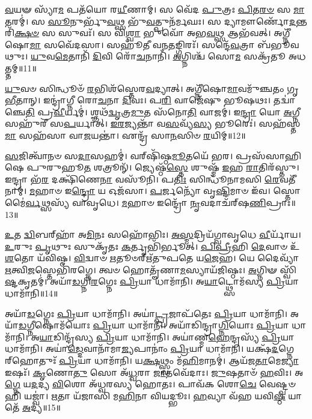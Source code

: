 \-\ul{𑌵}\-𑌯𑍟 𑌸𑍍𑌯𑌾᳴\-\ul{𑌮} 𑌪𑌤᳴𑌯𑍋 𑌰\-\ul{𑌯𑍀}\-𑌣𑌾𑌮𑍍।
𑌸 𑌵𑍇᳴𑌦 \ul{𑌪𑍁}\-𑌤𑍍𑌰𑌃 \ul{𑌪𑌿}\-𑌤\-\ul{𑌰}\-\-\ul{𑍞} 𑌸 \ul{𑌮𑌾}\-𑌤𑌰𑌮𑍍॑।
𑌸 \ul{𑌸𑍂}\-𑌨𑍁𑌰𑍍𑌭𑍁᳴\-\ul{𑌵}\-𑌥𑍍𑌸 𑌭𑍁᳴\-\ul{𑌵}\-𑌤𑍍𑌪𑍁𑌨᳴𑌰𑍍𑌮𑌘𑌃।
𑌸 𑌦𑍍𑌯𑌾𑌮𑍗𑌰𑍍𑌣𑍋᳴\-\ul{𑌦}\-𑌨𑍍𑌤𑌰𑌿᳴\-\ul{𑌕𑍍𑌷}\-\-\ul{𑍞} 𑌸 𑌸𑍁𑌵𑌃᳴।
𑌸 𑌵𑌿\-\ul{𑌶𑍍𑌵𑌾} 𑌭𑍁𑌵𑍋᳴ 𑌅𑌭\-\ul{𑌵}\-𑌥𑍍𑌸 𑌆𑌭᳴𑌵𑌤𑍍।
𑌅𑌗𑍍𑌨𑍀᳴𑌷𑍋\-\ul{𑌮𑌾} 𑌸𑌵𑍇᳴𑌦𑌸𑌾।
𑌸𑌹𑍂᳴𑌤𑍀 𑌵𑌨\-\ul{𑌤}\-𑌙𑍍𑌗𑌿𑌰𑌃᳴।
𑌸𑌨𑍍𑌦𑍇᳴\-\ul{𑌵}\-𑌤𑍍𑌰𑌾 𑌬᳴𑌭𑍂𑌵𑌥𑍁𑌃।
\-\ul{𑌯𑍁}\-𑌵\-\ul{𑌮𑍇}\-𑌤𑌾𑌨𑌿᳴ \ul{𑌦𑌿}\-𑌵𑌿 𑌰𑍋᳴\-\ul{𑌚}\-𑌨𑌾𑌨𑌿᳴।
\-\ul{𑌅}\-𑌗𑍍𑌨𑌿𑌶𑍍𑌚᳴ 𑌸𑍋\-\ul{𑌮} 𑌸𑌕𑍍𑌰᳴𑌤𑍂 𑌅𑌧𑌤𑍍𑌤𑌮𑍍॥11॥

\-\ul{𑌯𑍁}\-𑌵𑍞 𑌸𑌿𑌨𑍍𑌧𑍂𑍞᳴ \ul{𑌰}\-𑌭𑌿𑌶᳴𑌸𑍍𑌤𑍇𑌰\-\ul{𑌵}\-𑌦𑍍𑌯𑌾𑌤𑍍।
𑌅𑌗𑍍𑌨𑍀᳴𑌷𑍋\-\ul{𑌮𑌾}\-𑌵𑌮𑍁᳴𑌞𑍍𑌚𑌤𑌂 𑌗𑍃\-\ul{𑌭𑍀}\-𑌤𑌾𑌨𑍍।
𑌇𑌨𑍍𑌦𑍍𑌰𑌾॑𑌗𑍍𑌨𑍀 𑌰𑍋\-\ul{𑌚}\-𑌨𑌾 \ul{𑌦𑌿}\-𑌵𑌃।
𑌪\-\ul{𑌰𑌿} 𑌵𑌾𑌜𑍇᳴𑌷𑍁 𑌭𑍂𑌷𑌥𑌃।
𑌤𑌦𑍍𑌵𑌾॑𑌞𑍍𑌚𑍇\-\ul{𑌤𑌿} 𑌪𑍍𑌰\-\ul{𑌵𑍀}\-𑌰𑍍𑌯𑌮𑍍॑।
𑌶𑍍𑌞𑌥᳴\-\ul{𑌦𑍍𑌵𑍃}\-𑌤𑍍𑌰\-\ul{𑌮𑍁}\-𑌤 𑌸᳴𑌨𑍋\-\ul{𑌤𑌿} 𑌵𑌾𑌜𑌮𑍍॑।
𑌇\-\ul{𑌨𑍍𑌦𑍍𑌰𑌾} 𑌯𑍋 \ul{𑌅}\-𑌗𑍍𑌨𑍀 𑌸𑌹𑍁᳴𑌰𑍀 𑌸\-\ul{𑌪}\-𑌰𑍍𑌯𑌾𑌤𑍍।
\-\ul{𑌇}\-\-\ul{𑌰}\-𑌜𑍍𑌯𑌨𑍍𑌤𑌾᳴ 𑌵\-\ul{𑌸}\-𑌵𑍍𑌯᳴\-\ul{𑌸𑍍𑌯} 𑌭𑍂𑌰𑍇𑌃॑।
𑌸𑌹᳴𑌸𑍍𑌤\-\ul{𑌮𑌾} 𑌸𑌹᳴𑌸𑌾 𑌵𑌾\-\ul{𑌜}\-𑌯𑌨𑍍𑌤𑌾॑।
𑌏𑌨𑍍𑌦𑍍𑌰᳴ 𑌸𑌾\-\ul{𑌨}\-𑌸𑌿𑍞 \ul{𑌰}\-𑌯𑌿𑌮𑍍॥12॥

\-\ul{𑌸}\-𑌜𑌿𑌤𑍍𑌵𑌾᳴𑌨𑍞 𑌸\-\ul{𑌦𑌾}\-𑌸𑌹𑌮𑍍॑।
𑌵𑌰𑍍‌\mbox{}𑌷𑌿᳴𑌷𑍍𑌠\-\ul{𑌮𑍂}\-𑌤𑌯𑍇᳴ 𑌭𑌰।
𑌪𑍍𑌰𑌸᳴𑌸𑌾𑌹𑌿𑌷𑍇 𑌪𑍁𑌰𑍁𑌹𑍂\-\ul{𑌤} 𑌶𑌤𑍍𑌰𑍂𑌨𑍍᳴।
𑌜𑍍𑌯𑍇𑌷𑍍𑌠᳴\-\ul{𑌸𑍍𑌤𑍇} 𑌶𑍁𑌷𑍍𑌮᳴ \ul{𑌇}\-𑌹 \ul{𑌰𑌾}\-𑌤𑌿𑌰᳴𑌸𑍍𑌤𑍁।
𑌇𑌨𑍍𑌦𑍍𑌰𑌾 𑌭᳴\-\ul{𑌰} 𑌦𑌕𑍍𑌷𑌿᳴𑌣𑍇\-\ul{𑌨𑌾} 𑌵𑌸𑍂᳴𑌨𑌿।
𑌪\-\ul{𑌤𑌿𑌃} 𑌸𑌿𑌨𑍍𑌧𑍂᳴𑌨𑌾𑌮𑌸𑌿 \ul{𑌰𑍇}\-𑌵𑌤𑍀᳴𑌨𑌾𑌮𑍍।
\-\ul{𑌮}\-𑌹𑌾𑍞 𑌇\-\ul{𑌨𑍍𑌦𑍍𑌰𑍋} 𑌯 𑌓𑌜᳴𑌸𑌾।
\-\ul{𑌪}\-𑌰𑍍𑌜𑌨𑍍𑌯𑍋᳴ 𑌵𑍃\-\ul{𑌷𑍍𑌟𑌿}\-𑌮𑌾𑍞 𑌇᳴𑌵।
𑌸𑍍𑌤𑍋𑌮𑍈॑\-\ul{𑌰𑍍𑌵}\-𑌥𑍍𑌸𑌸𑍍𑌯᳴ 𑌵𑌾𑌵𑍃𑌧𑍇।
\-\ul{𑌮}\-𑌹𑌾𑍞 𑌇𑌨𑍍𑌦𑍍𑌰𑍋᳴ \ul{𑌨𑍃}\-𑌵𑌦𑌾𑌚᳴𑌰𑍍‌\mbox{}𑌷\-\ul{𑌣𑌿}\-𑌪𑍍𑌰𑌾𑌃॥13॥

\-\ul{𑌉}\-𑌤 \ul{𑌦𑍍𑌵𑌿}\-𑌬𑌰𑍍‌\mbox{}𑌹𑌾᳴ 𑌅\-\ul{𑌮𑌿}\-𑌨𑌃 𑌸𑌹𑍋᳴𑌭𑌿𑌃।
\-\ul{𑌅}\-\-\ul{𑌸𑍍𑌮}\-𑌦𑍍𑌰𑌿𑌯᳴𑌗𑍍𑌵𑌾𑌵𑍃𑌧𑍇 \ul{𑌵𑍀}\-𑌰𑍍𑌯𑌾᳴𑌯।
\-\ul{𑌉}\-𑌰𑍁𑌃 \ul{𑌪𑍃}\-𑌥𑍁𑌃 𑌸𑍁𑌕𑍃᳴𑌤𑌃 \ul{𑌕}\-𑌰𑍍𑌤𑍃𑌭𑌿᳴𑌰𑍍𑌭𑍂𑌤𑍍।
\-\ul{𑌪𑌿}\-\-\ul{𑌪𑍍𑌰𑍀}\-𑌹𑌿 \ul{𑌦𑍇}\-𑌵𑌾𑍞 𑌉᳴\-\ul{𑌶}\-𑌤𑍋 𑌯᳴𑌵𑌿𑌷𑍍𑌠।
\-\ul{𑌵𑌿}\-𑌦𑍍𑌵𑌾𑍞 \ul{𑌋}\-𑌤𑍂𑍞𑌰𑍍\mbox{}𑌋᳴𑌤𑍁𑌪𑌤𑍇 𑌯\-\ul{𑌜𑍇}\-𑌹।
𑌯𑍇 𑌦𑍈𑌵𑍍𑌯𑌾᳴ \ul{𑌋}\-𑌤𑍍𑌵𑌿\-\ul{𑌜}\-𑌸𑍍𑌤𑍇𑌭𑌿᳴𑌰𑌗𑍍𑌨𑍇।
𑌤𑍍𑌵𑍞 𑌹𑍋𑌤𑍄᳴𑌣𑌾\-\ul{𑌮}\-𑌸𑍍𑌯𑌾𑌯᳴𑌜𑌿𑌷𑍍𑌠𑌃।
\-\ul{𑌅}\-𑌗𑍍𑌨𑌿𑍟 𑌸𑍍𑌵𑌿᳴\-\ul{𑌷𑍍𑌟}\-𑌕𑍃𑌤𑌮𑍍॑।
𑌅𑌯𑌾᳴\-\ul{𑌡}\-𑌗𑍍𑌨𑌿\-\ul{𑌰}\-𑌗𑍍𑌨𑍇𑌃 \ul{𑌪𑍍𑌰𑌿}\-𑌯𑌾 𑌧𑌾𑌮𑌾᳴𑌨𑌿।
𑌅\-\ul{𑌯𑌾}\-𑌟𑍍𑌥𑍍𑌸𑍋𑌮᳴𑌸𑍍𑌯 \ul{𑌪𑍍𑌰𑌿}\-𑌯𑌾 𑌧𑌾𑌮𑌾᳴𑌨𑌿॥14॥

𑌅𑌯𑌾᳴\-\ul{𑌡}\-𑌗𑍍𑌨𑍇𑌃 \ul{𑌪𑍍𑌰𑌿}\-𑌯𑌾 𑌧𑌾𑌮𑌾᳴𑌨𑌿।
𑌅𑌯𑌾॑\-\ul{𑌟𑍍𑌪𑍍𑌰}\-𑌜𑌾𑌪᳴𑌤𑍇𑌃 \ul{𑌪𑍍𑌰𑌿}\-𑌯𑌾 𑌧𑌾𑌮𑌾᳴𑌨𑌿।
𑌅𑌯𑌾᳴\-\ul{𑌡}\-𑌗𑍍𑌨𑍀𑌷𑍋𑌮᳴𑌯𑍋𑌃 \ul{𑌪𑍍𑌰𑌿}\-𑌯𑌾 𑌧𑌾𑌮𑌾᳴𑌨𑌿।
𑌅𑌯𑌾᳴𑌡𑌿𑌨𑍍𑌦𑍍𑌰𑌾\-\ul{𑌗𑍍𑌨𑌿}\-𑌯𑍋𑌃 \ul{𑌪𑍍𑌰𑌿}\-𑌯𑌾 𑌧𑌾𑌮𑌾᳴𑌨𑌿।
𑌅\-\ul{𑌯𑌾}\-𑌡𑌿𑌨𑍍𑌦𑍍𑌰᳴𑌸𑍍𑌯 \ul{𑌪𑍍𑌰𑌿}\-𑌯𑌾 𑌧𑌾𑌮𑌾᳴𑌨𑌿।
𑌅𑌯𑌾॑𑌣𑍍𑌮\-\ul{𑌹𑍇}\-𑌨𑍍𑌦𑍍𑌰𑌸𑍍𑌯᳴ \ul{𑌪𑍍𑌰𑌿}\-𑌯𑌾 𑌧𑌾𑌮𑌾᳴𑌨𑌿।
𑌅𑌯𑌾॑\-\ul{𑌡𑍍𑌦𑍇}\-𑌵𑌾𑌨𑌾᳴𑌮𑌾\-\ul{𑌜𑍍𑌯}\-𑌪𑌾𑌨𑌾𑌂॑ \ul{𑌪𑍍𑌰𑌿}\-𑌯𑌾 𑌧𑌾𑌮𑌾᳴𑌨𑌿।
𑌯𑌕𑍍𑌷᳴\-\ul{𑌦}\-𑌗𑍍𑌨𑍇𑌰𑍍‌\mbox{}𑌹𑍋𑌤𑍁𑌃᳴ \ul{𑌪𑍍𑌰𑌿}\-𑌯𑌾 𑌧𑌾𑌮𑌾᳴𑌨𑌿।
𑌯\-\ul{𑌕𑍍𑌷}\-𑌥𑍍𑌸𑍍𑌵𑌂 𑌮᳴\-\ul{𑌹𑌿}\-𑌮𑌾𑌨𑌮𑍍॑।
𑌆𑌯᳴𑌜\-\ul{𑌤𑌾}\-𑌮𑍇\-\ul{𑌜𑍍𑌯𑌾} 𑌇𑌷𑌃᳴।
\-\ul{𑌕𑍃}\-𑌣𑍋\-\ul{𑌤𑍁} 𑌸𑍋 𑌅᳴\-\ul{𑌧𑍍𑌵}\-𑌰𑌾 \ul{𑌜𑌾}\-𑌤𑌵𑍇᳴𑌦𑌾𑌃।
\-\ul{𑌜𑍁}\-𑌷𑌤𑌾𑍞᳴ \ul{𑌹}\-𑌵𑌿𑌃।
𑌅\-\ul{𑌗𑍍𑌨𑍇} 𑌯\-\ul{𑌦}\-𑌦𑍍𑌯 \ul{𑌵𑌿}\-𑌶𑍋 𑌅᳴𑌧𑍍𑌵𑌰𑌸𑍍𑌯 𑌹𑍋𑌤𑌃।
𑌪𑌾𑌵᳴𑌕 𑌶𑍋\-\ul{𑌚𑍇} 𑌵𑍇𑌷𑍍𑌟𑍍𑌵𑍞 𑌹𑌿 𑌯𑌜𑍍𑌵𑌾॑।
\-\ul{𑌋}\-𑌤𑌾 𑌯᳴𑌜𑌾𑌸𑌿 𑌮\-\ul{𑌹𑌿}\-𑌨𑌾 𑌵𑌿𑌯𑌦𑍍𑌭𑍂𑌃।
\-\ul{𑌹}\-𑌵𑍍𑌯𑌾 𑌵᳴𑌹 𑌯𑌵𑌿\-\ul{𑌷𑍍𑌠} 𑌯𑌾 𑌤𑍇᳴ \ul{𑌅}\-𑌦𑍍𑌯॥15॥\anuvakamend[\-\ul{𑌅}\-\-\ul{𑌸𑍍𑌤𑍍𑌵}\-\-\ul{𑌧}\-\-\ul{𑌤𑍍𑌤}\-\-\ul{𑍞} \ul{𑌰}\-𑌯𑌿𑌂 𑌚᳴𑌰𑍍‌\mbox{}𑌷\-\ul{𑌣𑌿}\-𑌪𑍍𑌰𑌾𑌃 𑌸𑍋𑌮᳴𑌸𑍍𑌯 \ul{𑌪𑍍𑌰𑌿}\-𑌯𑌾 𑌧𑌾\-\ul{𑌮𑌾}\-𑌨𑍀\-\ul{𑌷𑌃} 𑌷𑌟𑍍𑌚᳴]

